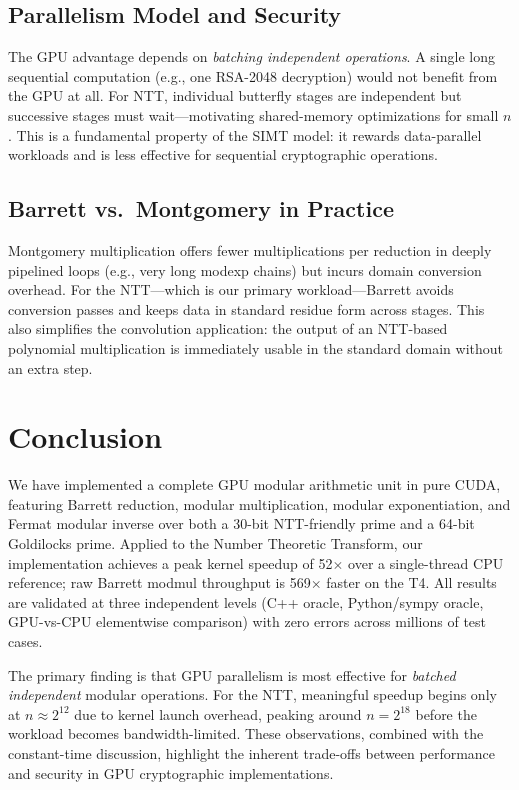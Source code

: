 \documentclass[conference]{IEEEtran}
\begin{document}
\subsection{Parallelism Model and Security}

The GPU advantage depends on \emph{batching independent operations}. A single long sequential
computation (e.g., one RSA-2048 decryption) would not benefit from the GPU at all. For NTT,
individual butterfly stages are independent but successive stages must wait—motivating shared-memory
optimizations for small $n$. This is a fundamental property of the SIMT model: it rewards
data-parallel workloads and is less effective for sequential cryptographic operations.

\subsection{Barrett vs.\ Montgomery in Practice}

Montgomery multiplication offers fewer multiplications per reduction in deeply pipelined loops
(e.g., very long modexp chains) but incurs domain conversion overhead. For the NTT—which is our
primary workload—Barrett avoids conversion passes and keeps data in standard residue form across
stages. This also simplifies the convolution application: the output of an NTT-based polynomial
multiplication is immediately usable in the standard domain without an extra step.

\section{Conclusion}
\label{sec:conclusion}

We have implemented a complete GPU modular arithmetic unit in pure CUDA, featuring Barrett
reduction, modular multiplication, modular exponentiation, and Fermat modular inverse over both a
30-bit NTT-friendly prime and a 64-bit Goldilocks prime. Applied to the Number Theoretic Transform,
our implementation achieves a peak kernel speedup of 52$\times$ over a single-thread CPU reference;
raw Barrett modmul throughput is 569$\times$ faster on the T4. All results are validated at three
independent levels (C++ oracle, Python/sympy oracle, GPU-vs-CPU elementwise comparison) with zero
errors across millions of test cases.

The primary finding is that GPU parallelism is most effective for \emph{batched independent}
modular operations. For the NTT, meaningful speedup begins only at $n \approx 2^{12}$ due to kernel
launch overhead, peaking around $n = 2^{18}$ before the workload becomes bandwidth-limited. These
observations, combined with the constant-time discussion, highlight the inherent trade-offs between
performance and security in GPU cryptographic implementations.
\end{document}
